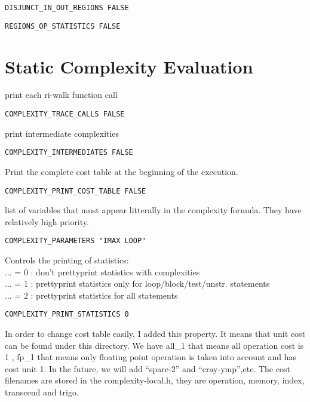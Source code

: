 \begin{verbatim}
DISJUNCT_IN_OUT_REGIONS FALSE
\end{verbatim}


\begin{verbatim}
REGIONS_OP_STATISTICS FALSE
\end{verbatim}


\section{Static Complexity Evaluation}

print each ri-walk function call

\begin{verbatim}
COMPLEXITY_TRACE_CALLS FALSE
\end{verbatim}


print intermediate complexities 

\begin{verbatim}
COMPLEXITY_INTERMEDIATES FALSE
\end{verbatim}

Print the complete cost table at the beginning of the execution.

\begin{verbatim}
COMPLEXITY_PRINT_COST_TABLE FALSE
\end{verbatim}

list of variables that must appear litterally in the complexity formula.
They have relatively high priority.

\begin{verbatim}
COMPLEXITY_PARAMETERS "IMAX LOOP"
\end{verbatim}

Controls the printing of statistics:    \\
 ... = 0 : don't prettyprint statistics with complexities  \\
 ... = 1 : prettyprint statistics only for loop/block/test/unstr.
statements \\
 ... = 2 : prettyprint statistics for all statements

\begin{verbatim}
COMPLEXITY_PRINT_STATISTICS 0
\end{verbatim}

In order to change cost table easily, I added this property.
It means that unit cost can be found under this directory. We have all_1
that means all operation cost is 1 , fp_1 that means only floating
point operation is taken into account and has cost unit 1.
In the future, we will add ``sparc-2'' and ``cray-ymp'',etc.
The cost filenames are stored in the complexity-local.h, they are operation,
memory, index, transcend and trigo.

